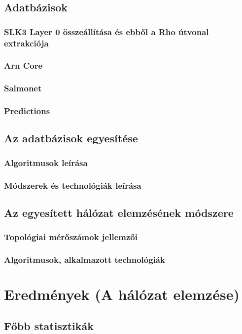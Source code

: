 \documentclass[a4paper,12pt]{article}
\begin{document}
	\subsection{Adatbázisok}
		\subsubsection{SLK3 Layer 0 összeállítása és ebből a Rho útvonal extrakciója}
		\subsubsection{Arn Core}
		\subsubsection{Salmonet}
		\subsubsection{Predictions}

	\subsection{Az adatbázisok egyesítése}
		\subsubsection{Algoritmusok leírása}
		\subsubsection{Módszerek és technológiák leírása}

	\subsection{Az egyesített hálózat elemzésének módszere}
		\subsubsection{Topológiai mérőszámok jellemzői}
		\subsubsection{Algoritmusok, alkalmazott technológiák}

\section{Eredmények (A hálózat elemzése)}
	\subsection{Főbb statisztikák}
\end{document}
